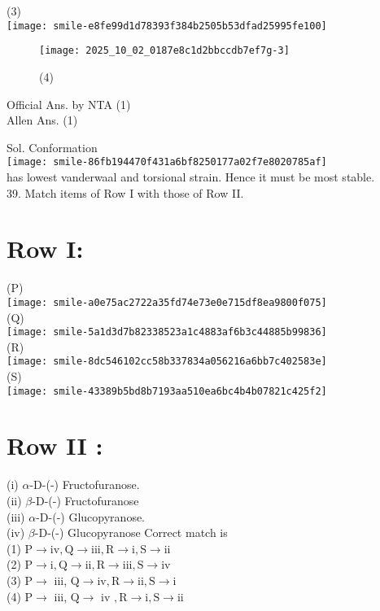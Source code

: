 \documentclass[10pt]{article}
\begin{document}
(3)\\
\texttt{[image: smile-e8fe99d1d78393f384b2505b53dfad25995fe100]}

\begin{figure}[h]
\begin{center}
\captionsetup{labelformat=empty}
\caption{(4)}
  \texttt{[image: 2025\_10\_02\_0187e8c1d2bbccdb7ef7g-3]}
\end{center}
\end{figure}

Official Ans. by NTA (1)\\
Allen Ans. (1)

Sol. Conformation\\
\texttt{[image: smile-86fb194470f431a6bf8250177a02f7e8020785af]}\\
has lowest vanderwaal and torsional strain. Hence it must be most stable.\\
39. Match items of Row I with those of Row II.

\section*{Row I:}
(P)\\
\texttt{[image: smile-a0e75ac2722a35fd74e73e0e715df8ea9800f075]}\\
(Q)\\
\texttt{[image: smile-5a1d3d7b82338523a1c4883af6b3c44885b99836]}\\
(R)\\
\texttt{[image: smile-8dc546102cc58b337834a056216a6bb7c402583e]}\\
(S)\\
\texttt{[image: smile-43389b5bd8b7193aa510ea6bc4b4b07821c425f2]}

\section*{Row II :}
(i) \(\alpha\)-D-(-) Fructofuranose.\\
(ii) \(\beta\)-D-(-) Fructofuranose\\
(iii) \(\alpha\)-D-(-) Glucopyranose.\\
(iv) \(\beta\)-D-(-) Glucopyranose Correct match is\\
(1) \(\mathrm{P} \rightarrow \mathrm{iv}, \mathrm{Q} \rightarrow \mathrm{iii}, \mathrm{R} \rightarrow \mathrm{i}, \mathrm{S} \rightarrow \mathrm{ii}\)\\
(2) \(\mathrm{P} \rightarrow \mathrm{i}, \mathrm{Q} \rightarrow \mathrm{ii}, \mathrm{R} \rightarrow \mathrm{iii}, \mathrm{S} \rightarrow \mathrm{iv}\)\\
(3) \(\mathrm{P} \rightarrow\) iii, \(\mathrm{Q} \rightarrow \mathrm{iv}, \mathrm{R} \rightarrow \mathrm{ii}, \mathrm{S} \rightarrow \mathrm{i}\)\\
(4) \(\mathrm{P} \rightarrow\) iii, \(\mathrm{Q} \rightarrow\) iv \(, \mathrm{R} \rightarrow \mathrm{i}, \mathrm{S} \rightarrow \mathrm{ii}\)
\end{document}
